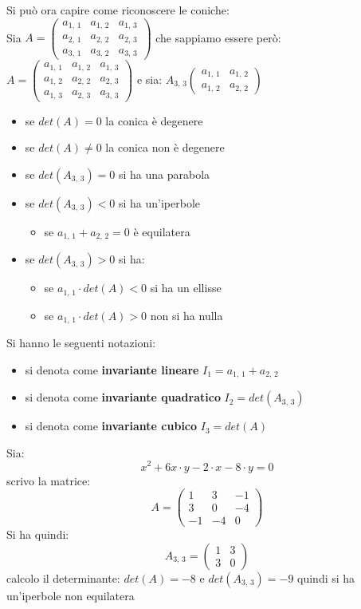 \documentclass[a4paper,12pt, oneside]{book}
\begin{document}
Si può ora capire come riconoscere le coniche:\\
Sia $A=
\left(\begin{matrix}
a_{1,\,1} & a_{1,\,2} & a_{1,\,3}\\
a_{2,\,1} & a_{2,\,2} & a_{2,\,3}\\
a_{3,\,1} & a_{3,\,2} & a_{3,\,3}
\end{matrix}\right)$ che sappiamo essere però:
$A=
\left(\begin{matrix}
a_{1,\,1} & a_{1,\,2} & a_{1,\,3}\\
a_{1,\,2} & a_{2,\,2} & a_{2,\,3}\\
a_{1,\,3} & a_{2,\,3} & a_{3,\,3}
\end{matrix}\right)$
e sia:
$
A_{3,\,3}\left(\begin{matrix}
a_{1,\,1} & a_{1,\,2} \\
a_{1,\,2} & a_{2,\,2} 
\end{matrix}\right)
$
\begin{itemize}
\item se $det(A)=0 $ la conica è degenere
\item se $det(A)\neq 0 $ la conica non è degenere
\item se $det(A_{3,\,3})= 0 $ si ha una parabola
\item se $det(A_{3,\,3})< 0 $ si ha un'iperbole
\begin{itemize}
\item se $a_{1,\,1}+a_{2,\,2}=0$ è equilatera
\end{itemize}
\item se $det(A_{3,\,3})>0$ si ha:
\begin{itemize}
\item se $a_{1,\,1}\cdot det(A)<0$ si ha un ellisse
\item se $a_{1,\,1}\cdot det(A)>0$ non si ha nulla
\end{itemize}
\end{itemize}
Si hanno le seguenti notazioni:
\begin{itemize}
\item si denota come \textbf{invariante lineare} $I_1=a_{1,\,1}+a_{2,\,2}$
\item si denota come \textbf{invariante quadratico}  $I_2=det(A_{3,\,3})$
\item si denota come \textbf{invariante cubico} $I_3=det(A)$
\end{itemize}
\newpage
\begin{esempio}
Sia:
$$x^2+6x\cdot y-2\cdot x-8\cdot y=0$$
scrivo la matrice:
$$
A=\left(\begin{matrix}
1 & 3 & -1\\
3 & 0 & -4\\
-1 & -4 & 0
\end{matrix}\right)
$$
Si ha quindi:
$$
A_{3,\,3}=\left(\begin{matrix}
1 & 3\\
3 & 0 
\end{matrix}\right)
$$
calcolo il determinante: $det(A)=-8$ e $det(A_{3,\,3})=-9$ quindi si ha un'iperbole non equilatera
\end{esempio}
\end{document}
